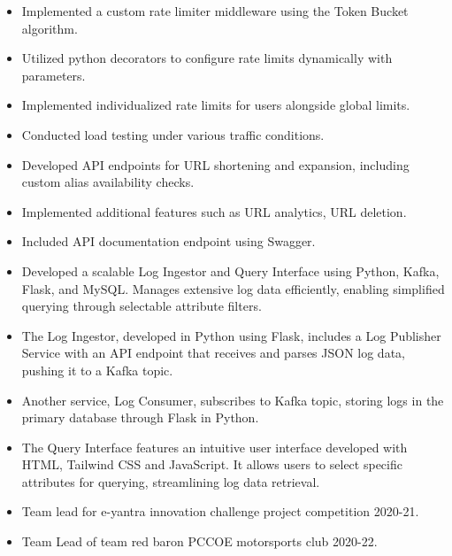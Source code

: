 \smallskip
{}


\smallskip
{}
\smallskip
\begin{itemize}
\item Implemented a custom rate limiter middleware using the Token Bucket algorithm.
\item Utilized python decorators to configure rate limits dynamically with parameters.
\item Implemented individualized rate limits for users alongside global limits.
\item Conducted load testing under various traffic conditions.
\end{itemize}
\smallskip
{}
\smallskip
\begin{itemize}
\item Developed API endpoints for URL shortening and expansion, including custom alias availability checks.
\item Implemented additional features such as URL analytics, URL deletion.
\item Included API documentation endpoint using Swagger.
\end{itemize}
\smallskip
{}
\smallskip
\begin{itemize}
\item Developed a scalable Log Ingestor and Query Interface using Python, Kafka, Flask, and MySQL. Manages extensive log data efficiently, enabling simplified querying through selectable attribute filters.
\item The Log Ingestor, developed in Python using Flask, includes a Log Publisher Service with an API endpoint that receives and parses JSON log data, pushing it to a Kafka topic.
\item  Another service, Log Consumer, subscribes to Kafka topic, storing logs in the primary database through Flask in Python.
\item The Query Interface features an intuitive user interface developed with HTML, Tailwind CSS and JavaScript. It allows users to select specific attributes for querying, streamlining log data retrieval.
\end{itemize}
\cvproject{}

\smallskip
\begin{itemize}
\item Team lead for e-yantra innovation challenge project competition 2020-21.
\smallskip
\item Team Lead of team red baron PCCOE motorsports club 2020-22.
\end{itemize}
